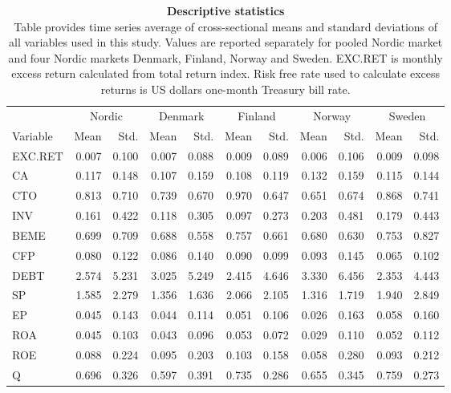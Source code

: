 \documentclass{article}
\begin{document}
\begin{table}[ht] 
\small
\caption[Descriptive statistics]{\textbf{Descriptive statistics}\\ Table provides time series average of cross-sectional means and standard deviations of all variables used in this study. Values are reported separately for pooled Nordic market and four Nordic markets Denmark, Finland, Norway and Sweden. EXC.RET is monthly excess return calculated from total return index. Risk free rate used to calculate excess returns is US dollars one-month Treasury bill rate.}
 \label{table:DescriptiveStatistics}
\centering
\begin{tabularx}{\textwidth}{@{\extracolsep{1pt}} X r r r r r r r r r r} 
\toprule
 & \multicolumn{2}{c}{Nordic} & \multicolumn{2}{c}{Denmark} & \multicolumn{2}{c}{Finland} & \multicolumn{2}{c}{Norway}&\multicolumn{2}{c}{Sweden} \\
\cline{2-3}\cline{4-5}\cline{6-7}\cline{8-9}\cline{10-11}
Variable 		& Mean 	& Std. 	& Mean 	& Std. 	& Mean 	& Std. 	& Mean 	& Std. 	& Mean 	& Std. \\
\midrule
EXC.RET		& 0.007 	& 0.100	& 0.007 	& 0.088	& 0.009	& 0.089	& 0.006	& 0.106	& 0.009	& 0.098 \\
CA		 	& 0.117 	& 0.148	& 0.107 	& 0.159	& 0.108	& 0.119	& 0.132	& 0.159	& 0.115	& 0.144 \\
CTO		 	& 0.813  	& 0.710 	& 0.739 	& 0.670	& 0.970	& 0.647	& 0.651	& 0.674	& 0.868	& 0.741 \\
INV 			& 0.161 	& 0.422	& 0.118 	& 0.305	& 0.097	& 0.273	& 0.203	& 0.481	& 0.179	& 0.443 \\
BEME	 	& 0.699 	& 0.709	& 0.688 	& 0.558	& 0.757	& 0.661	& 0.680	& 0.630	& 0.753	& 0.827 \\
CFP	 		& 0.080 	& 0.122	& 0.086 	& 0.140	& 0.090	& 0.099	& 0.093	& 0.145	& 0.065	& 0.102 \\
DEBT	 	& 2.574 	& 5.231	& 3.025 	& 5.249	& 2.415	& 4.646	& 3.330	& 6.456	& 2.353	& 4.443 \\
SP 			& 1.585	& 2.279	& 1.356 	& 1.636	& 2.066	& 2.105	& 1.316	& 1.719	& 1.940	& 2.849 \\
EP 			& 0.045	& 0.143	& 0.044 	& 0.114	& 0.051	& 0.106	& 0.026	& 0.163	& 0.058	& 0.160 \\
ROA 		& 0.045	& 0.103	& 0.043 	& 0.096	& 0.053	& 0.072	& 0.029	& 0.110	& 0.052	& 0.112 \\
ROE 		& 0.088 	& 0.224	& 0.095 	& 0.203	& 0.103	& 0.158	& 0.058	& 0.280	& 0.093	& 0.212 \\
Q			& 0.696 	& 0.326	& 0.597 	& 0.391	& 0.735	& 0.286	& 0.655	& 0.345	& 0.759 	& 0.273 \\

\end{tabularx}
\end{table}
\end{document}
